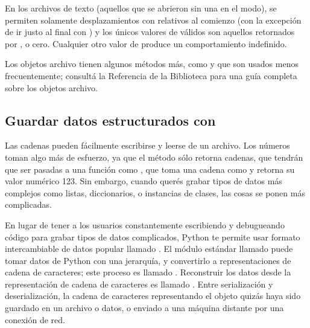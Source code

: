 \documentclass[a5paper,10pt,spanish]{sphinxmanual}
\begin{document}
\sphinxAtStartPar
En los archivos de texto (aquellos que se abrieron sin una  en el modo), se permiten solamente desplazamientos con  relativos al comienzo (con la excepción de ir justo al final con ) y los únicos valores de  válidos son aquellos retornados por , o cero. Cualquier otro valor de  produce un comportamiento indefinido.

\sphinxAtStartPar
Los objetos archivo tienen algunos métodos más, como  y  que son usados menos frecuentemente; consultá la Referencia de la Biblioteca para una guía completa sobre los objetos archivo.


\subsection{Guardar datos estructurados con }
\label{\detokenize{tutorial/inputoutput:saving-structured-data-with-json}}\label{\detokenize{tutorial/inputoutput:tut-json}}
\ignorespaces 
\sphinxAtStartPar
Las cadenas pueden fácilmente escribirse y leerse de un archivo.  Los números toman algo más de esfuerzo, ya que el método  sólo retorna cadenas, que tendrán que ser pasadas a una función como , que toma una cadena como  y retorna su valor numérico 123.  Sin embargo, cuando querés grabar tipos de datos más complejos como listas, diccionarios, o instancias de clases, las cosas se ponen más complicadas.

\sphinxAtStartPar
En lugar de tener a los usuarios constantemente escribiendo y debugueando código para grabar tipos de datos complicados, Python te permite usar formato intercambiable de datos popular llamado . El módulo estándar llamado  puede tomar datos de Python con una jerarquía, y convertirlo a representaciones de cadena de caracteres; este proceso es llamado . Reconstruir los datos desde la representación de cadena de caracteres es llamado . Entre serialización y deserialización, la cadena de caracteres representando el objeto quizás haya sido guardado en un archivo o datos, o enviado a una máquina distante por una conexión de red.
\end{document}
